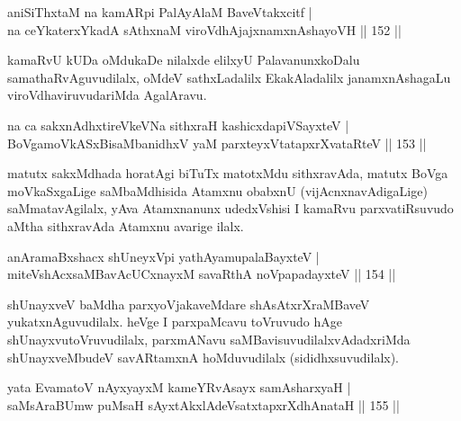 
\begin{shl}
aniSiThxtaM na kamARpi PalAyAlaM BaveVtakxcitf |\\
na ceYkaterxYkadA sAthxnaM viroVdhAjajxnamxnAshayoVH \hfill || 152 ||
\end{shl}

\begin{artha}
kamaRvU kUDa oMdukaDe nilalxde elilxyU PalavanunxkoDalu samathaRvAguvudilalx, oMdeV sathxLadalilx EkakAladalilx janamxnAshagaLu viroVdhaviruvudariMda AgalAravu.
\end{artha}

\begin{shl}
na ca sakxnAdhxtireVkeVNa sithxraH kashicxdapiVSayxteV |\\
BoVgamoVkASxBisaMbanidhxV yaM parxteyxVtatapxrXvataRteV \hfill || 153 ||
\end{shl}

\begin{artha}
matutx sakxMdhada horatAgi biTuTx matotxMdu sithxravAda, matutx BoVga moVkaSxgaLige saMbaMdhisida Atamxnu obabxnU (vijAcnxnavAdigaLige) saMmatavAgilalx, yAva Atamxnanunx udedxVshisi I kamaRvu parxvatiRsuvudo aMtha sithxravAda Atamxnu avarige ilalx.
\end{artha}


\begin{shl}
anAramaBxshacx shUneyxV\s pi yathA\s yamupalaBayxteV |\\
miteVshAcxsaMBavAcUCxnayxM savaRthA noVpapadayxteV \hfill || 154 ||
\end{shl}

\begin{artha}
shUnayxveV baMdha parxyoVjakaveMdare shAsAtxrXraMBaveV yukatxnAguvudilalx. heVge I parxpaMcavu toVruvudo hAge shUnayxvutoVruvudilalx, parxmANavu saMBavisuvudilalxvAdadxriMda shUnayxveMbudeV savARtamxnA hoMduvudilalx (sididhxsuvudilalx).
\end{artha}


\begin{shl}
yata EvamatoV nAyxyayxM kameYRvAsayx samAsharxyaH |\\
saMsAraBUmw puMsaH sAyxtAkxlAdeVsatxtapxrXdhAnataH \hfill || 155 ||
\end{shl}

